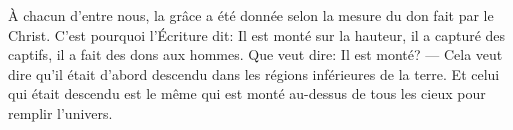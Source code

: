 À chacun d’entre nous, la grâce a été donnée selon la mesure du don fait par le Christ.
C’est pourquoi l’Écriture dit:
	Il est monté sur la hauteur, il a capturé des captifs, il a fait des dons aux hommes.
Que veut dire: Il est monté?
	--- Cela veut dire
	qu’il était d’abord descendu dans les régions inférieures de la terre.
Et celui qui était descendu
	est le même qui est monté au-dessus de tous les cieux pour remplir l’univers.
